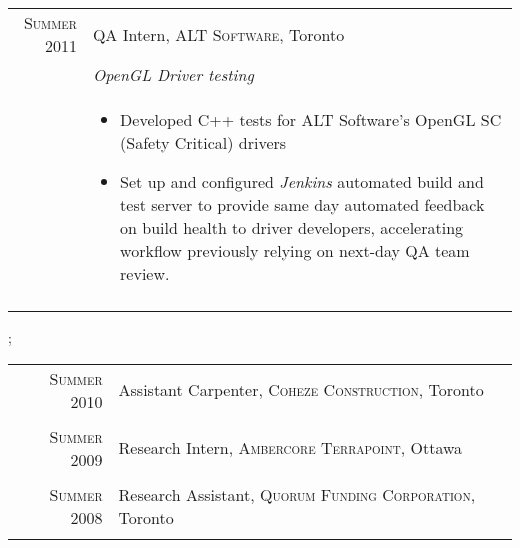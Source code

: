 \documentclass[a4paper,10pt]{article}
\begin{document}
\begin{longtable}{r|p{15cm}}
\textsc{Summer 2011} & QA Intern, \textsc{ALT Software}, Toronto \\
                                     &\emph{OpenGL Driver testing}\\
                                     &\footnotesize{
\begin{itemize}\vspace*{-\baselineskip}
  \item Developed C++ tests for ALT Software's OpenGL SC (Safety Critical) drivers
  \item Set up and configured \textit{Jenkins} automated build and test server to provide same day automated feedback on build health to driver developers, accelerating workflow previously relying on next-day QA team review.  
\end{itemize}\vspace*{-\baselineskip}\vspace*{-\baselineskip} %
} \\\multicolumn{2}{c}{} \\

\end{longtable}\vspace*{-\baselineskip}

\newpage
{};
\hspace{-0.75cm}
\makebox[0pt][s]{%
  \raisebox{-\totalheight}[0pt][0pt]{%
``  \begin{tikzpicture}
	\draw[draw=white,fill=white, opacity=0.9] (0,0) rectangle ++(\paperwidth-2cm,\paperheight-4.5cm);
    \end{tikzpicture}
  }
}%

\begin{longtable}{r|p{15cm}}

\textsc{Summer 2010} & Assistant Carpenter, \textsc{Coheze Construction}, Toronto \\\multicolumn{2}{c}{} \\

\textsc{Summer 2009} & Research Intern, \textsc{Ambercore Terrapoint}, Ottawa \\\multicolumn{2}{c}{} \\

\textsc{Summer 2008} & Research Assistant, \textsc{Quorum Funding Corporation}, Toronto \\\multicolumn{2}{c}{} \\

\end{longtable}\vspace*{-\baselineskip}
\end{document}
